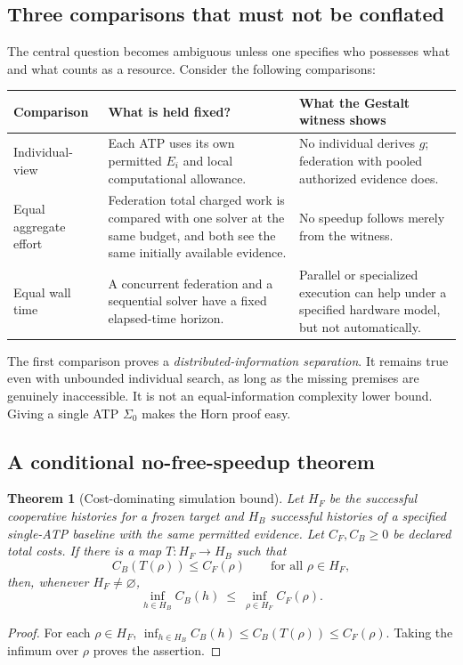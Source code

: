 \documentclass[11pt,letterpaper]{article}
\newtheorem{theorem}{Theorem}[section]
\theoremstyle{definition}
\theoremstyle{remark}
\begin{document}
\subsection{Three comparisons that must not be conflated}
The central question becomes ambiguous unless one specifies who possesses what and what counts as a resource. Consider the following comparisons:
\begin{center}
\small
\begin{tabularx}{\textwidth}{@{}p{}X X@{}}
\toprule
\textbf{Comparison} & \textbf{What is held fixed?} & \textbf{What the Gestalt witness shows} \\
\midrule
Individual-view & Each ATP uses its own permitted $E_i$ and local computational allowance. & No individual derives $g$; federation with pooled authorized evidence does. \\
Equal aggregate effort & Federation total charged work is compared with one solver at the same budget, and both see the same initially available evidence. & No speedup follows merely from the witness. \\
Equal wall time & A concurrent federation and a sequential solver have a fixed elapsed-time horizon. & Parallel or specialized execution can help under a specified hardware model, but not automatically. \\
\bottomrule
\end{tabularx}
\end{center}
The first comparison proves a \emph{distributed-information separation}. It remains true even with unbounded individual search, as long as the missing premises are genuinely inaccessible. It is not an equal-information complexity lower bound. Giving a single ATP $\Sigma_0$ makes the Horn proof easy.

\subsection{A conditional no-free-speedup theorem}
\begin{theorem}[Cost-dominating simulation bound]\label{thm:sim}
Let $H_F$ be the successful cooperative histories for a frozen target and $H_B$ successful histories of a specified single-ATP baseline with the same permitted evidence. Let $C_F,C_B\ge0$ be declared total costs. If there is a map $T:H_F\to H_B$ such that
\[
C_B(T(\rho))\le C_F(\rho)\qquad\text{for all }\rho\in H_F,
\]
then, whenever $H_F\ne\varnothing$,
\[
\inf_{h\in H_B}C_B(h)\ \le\ \inf_{\rho\in H_F}C_F(\rho).
\]
\end{theorem}
\begin{proof}
For each $\rho\in H_F$, $\inf_{h\in H_B}C_B(h)\le C_B(T(\rho))\le C_F(\rho)$. Taking the infimum over $\rho$ proves the assertion.
\end{proof}
\end{document}
